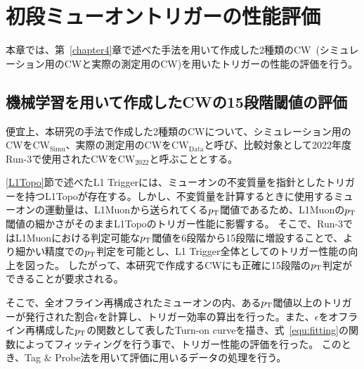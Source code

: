 \chapter{初段ミューオントリガーの性能評価}\label{chapter5}
本章では、第~\ref{chapter4}章で述べた手法を用いて作成した2種類のCW~(シミュレーション用のCWと実際の測定用のCW)を用いたトリガーの性能の評価を行う。

\section{機械学習を用いて作成したCWの15段階閾値の評価}
便宜上、本研究の手法で作成した2種類のCWについて、シミュレーション用のCWを$\mathrm{CW_{Simu}}$、実際の測定用のCWを$\mathrm{CW_{Data}}$と呼び、比較対象として2022年度Run-3で使用されたCWを$\mathrm{CW_{2022}}$と呼ぶこととする。

\ref{L1Topo}節で述べたL1 Triggerには、ミューオンの不変質量を指針としたトリガーを持つL1Topoが存在する。しかし、不変質量を計算するときに使用するミューオンの運動量は、L1Muonから送られてくる$p_{\rm{T}}$閾値であるため、L1Muonの$p_{\rm{T}}$閾値の細かさがそのままL1Topoのトリガー性能に影響する。
そこで、Run-3ではL1Muonにおける判定可能な$p_{\rm{T}}$閾値を6段階から15段階に増設することで、より細かい精度での$p_{\rm{T}}$判定を可能とし、L1 Trigger全体としてのトリガー性能の向上を図った。
したがって、本研究で作成するCWにも正確に15段階の$p_{\rm{T}}$判定ができることが要求される。

そこで、全オフライン再構成されたミューオンの内、ある$p_{\rm{T}}$閾値以上のトリガーが発行された割合$\epsilon$を計算し、トリガー効率の算出を行った。また、$\epsilon$をオフライン再構成した$p_{\rm{T}}$の関数として表したTurn-on curveを描き、式~\eqref{equ:fitting}の関数によってフィッティングを行う事で、トリガー性能の評価を行った。
このとき、Tag $\&$ Probe法を用いて評価に用いるデータの処理を行う。

